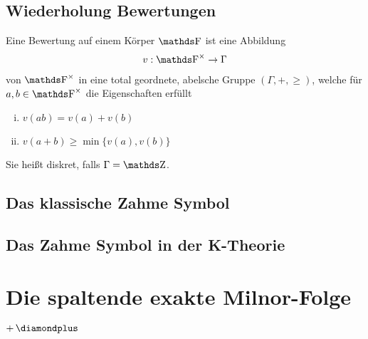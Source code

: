 \documentclass[ngerman,fontsize=11pt, paper=a4, parskip=half, titlepage=true, toc=bib]{scrartcl}
\begin{document}
\subsection{Wiederholung Bewertungen}
\begin{Def}[Bewertungsabbildung]
Eine Bewertung auf einem Körper $\F$ ist eine Abbildung
\begin{gather*}
  v:\Fx\to \Gamma
\end{gather*}
von $\Fx$ in eine total geordnete, abelsche Gruppe $(\Gamma, +,\geq)$,
welche für $a,b\in\Fx$ die Eigenschaften erfüllt
\begin{enumerate}[i)]
\item $v(ab)=v(a)+v(b)$
\item $v(a+b)\geq \min\{v(a),v(b)\}$
\end{enumerate}
Sie heißt diskret, falls $\Gamma=\Z$.
\end{Def}

\begin{Def}\end{Def}

\subsection{Das klassische Zahme Symbol}
\begin{Def}\end{Def}

\subsection{Das Zahme Symbol in der K-Theorie}
\begin{Satz}\end{Satz}


\section{Die spaltende exakte Milnor-Folge}
\cite[][Theorem 2.3]{milnor}
$+ \p$
\printindex

\nocite{*}
\printbibliography
\end{document}
